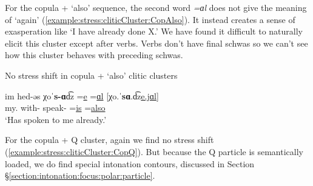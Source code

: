 For the copula + `also' sequence, the second word \textit{=ɑl} does not give the meaning of `again' (\ref{example:stress:cliticCluster:CopAlso}). It instead creates a sense of exasperation like `I have already done X.'  We have found it difficult to naturally elicit this cluster except after verbs. Verbs don't have final schwas so we can't see how this cluster behaves with preceding schwas. 

\begin{exe}
	\ex No stress shift in copula + `also' clitic clusters\label{example:stress:cliticCluster:CopAlso}
	\begin{xlist}
		\ex \gll im hed-əs χoˈ\textbf{s-ɑ}d͡z =\underline{e} =\underline{ɑl} [χo.ˈ\textbf{sɑ}.d͡z\underline{e.jɑl}]
		\\
		my.{\gen} with-{\possFsg} speak-{\rptcp} =\underline{is} =\underline{also}
		\\
		\trans `Has spoken to me already.' 
		\\
	\end{xlist}
\end{exe}

For the copula + Q cluster, again we find no stress shift (\ref{example:stress:cliticCluster:CopQ}). But because the Q particle is semantically loaded, we do find special intonation contours, discussed in Section \S\ref{section:intonation:focus:polar:particle}.  


